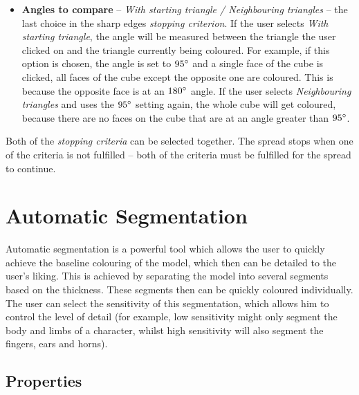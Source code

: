 \begin{itemize}
\item \textbf{Angles to compare} -- \textit{With starting triangle / Neighbouring triangles} -- the last choice in the sharp edges \textit{stopping criterion}. If the user selects \textit{With starting triangle}, the angle will be measured between the triangle the user clicked on and the triangle currently being coloured. For example, if this option is chosen, the angle is set to $95\degree$ and a single face of the cube is clicked, all faces of the cube except the opposite one are coloured. This is because the opposite face is at an $180\degree$ angle. If the user selects \textit{Neighbouring triangles} and uses the $95\degree$ setting again, the whole cube will get coloured, because there are no faces on the cube that are at an angle greater than $95\degree$.

\end{itemize}

Both of the \textit{stopping criteria} can be selected together. The spread stops when one of the criteria is not fulfilled -- both of the criteria must be fulfilled for the spread to continue.

\section{Automatic Segmentation}

Automatic segmentation is a powerful tool which allows the user to quickly achieve the baseline colouring of the model, which then can be detailed to the user's liking. This is achieved by separating the model into several segments based on the thickness. These segments then can be quickly coloured individually. The user can select the sensitivity of this segmentation, which allows him to control the level of detail (for example, low sensitivity might only segment the body and limbs of a character, whilst high sensitivity will also segment the fingers, ears and horns).

\subsection{Properties}

